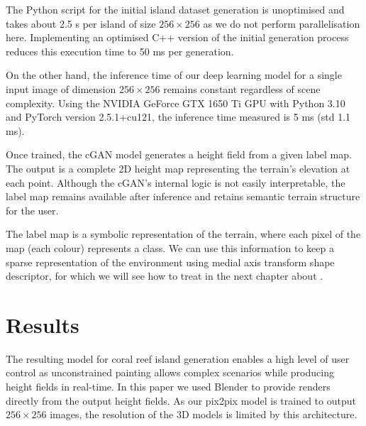 The Python script for the initial island dataset generation is unoptimised and takes about 2.5 s per island of size $256 \times 256$ as we do not perform parallelisation here. Implementing an optimised C++ version of the initial generation process reduces this execution time to 50 ms per generation.

On the other hand, the inference time of our deep learning model for a single input image of dimension $256 \times 256$ remains constant regardless of scene complexity. Using the NVIDIA GeForce GTX 1650 Ti GPU with Python 3.10 and PyTorch version 2.5.1+cu121, the inference time measured is 5 ms (std 1.1 ms).

Once trained, the cGAN model generates a height field from a given label map. The output is a complete 2D height map representing the terrain's elevation at each point. Although the cGAN's internal logic is not easily interpretable, the label map remains available after inference and retains semantic terrain structure for the user.

The label map is a symbolic representation of the terrain, where each pixel of the map (each colour) represents a class. We can use this information to keep a sparse representation of the environment using medial axis transform shape descriptor, for which we will see how to treat in the next chapter about .


\section{Results}
\label{sec:coral-island-results}

The resulting model for coral reef island generation enables a high level of user control as unconstrained painting allows complex scenarios while producing height fields in real-time. In this paper we used Blender to provide renders directly from the output height fields. As our pix2pix model is trained to output $256\times256$ images, the resolution of the 3D models is limited by this architecture.

